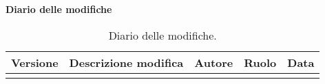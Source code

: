 \textbf{\Large Diario delle modifiche}
\vspace{0.5cm}
\small
\begin{longtable}{|c|m{4cm}|>{\centering}m{2.7cm}|c|c|}
\hline 
\textbf{Versione} & \textbf{Descrizione modifica} & \textbf{Autore} & \textbf{Ruolo} & \textbf{Data}\\ \hline \endhead

\caption{Diario delle modifiche.}
\label{tabella:diarioModifiche}
\end{longtable}
\clearpage
